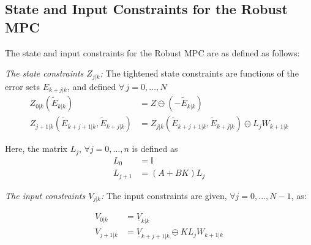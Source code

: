 \subsection{State and Input Constraints for the Robust MPC}

The state and input constraints for the Robust MPC are as defined as follows:

\textit{The state constraints $Z_{j|k}$:}
The tightened state constraints are functions of the error sets $E_{k+j|k}$, and defined $\forall\,j=0,\dotsc,N$
\small{
\begin{subequations} \label{eq:Set_constraints}
\begin{align}
Z_{0|k}(\tilde{E}_{k|k}) &=Z\ominus(-\tilde{E}_{k|k}) \\
Z_{j+1|k}(\tilde{E}_{k+j+1|k},\tilde{E}_{k+j|k}) &= Z_{j|k}(\tilde{E}_{k+j+1|k},\tilde{E}_{k+j|k})\ominus L_{j}W_{k+1|k}
\end{align}
\end{subequations}}

Here, the matrix $L_j$, $\forall j=0,\dotsc,n$   is defined as
\begin{subequations} \label{eq:L_def}
\begin{align}
L_0&=\mathbb{I} \\
L_{j+1} &= (A+BK)L_j
\end{align}
\end{subequations}

\textit{The input constraints $V_{j|k}$:}
The input constraints are given, $\forall j=0,...,N-1$, as:

\begin{subequations}
\begin{align}
V_{0|k} &= \underline{V}_{k|k} \\
V_{j+1|k} &= \underline{V}_{k+j+1|k} \ominus KL_jW_{k+1|k}
\end{align}
\end{subequations}

